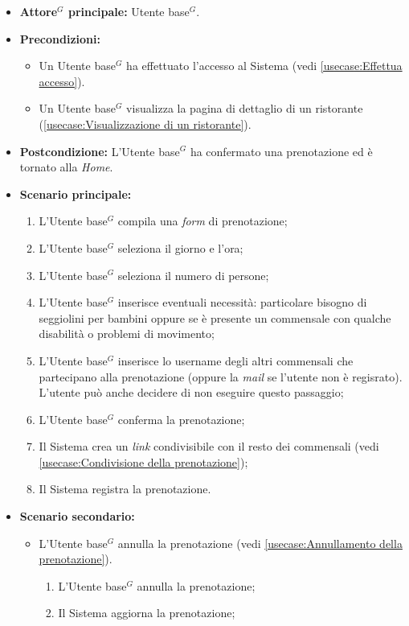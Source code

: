 \label{usecase:Prenotazione di un tavolo}
\begin{itemize}
	\item \textbf{\gls{Attore}$^G$ principale:} \gls{Utente base}$^G$.
	\item \textbf{Precondizioni:}
	      \begin{itemize}
		      \item Un \gls{Utente base}$^G$ ha effettuato l'accesso al Sistema (vedi \autoref{usecase:Effettua accesso}).
		      \item Un \gls{Utente base}$^G$ visualizza la pagina di dettaglio di un ristorante (\autoref{usecase:Visualizzazione di un ristorante}).
	      \end{itemize}
	\item \textbf{Postcondizione:} L'\gls{Utente base}$^G$ ha confermato una prenotazione ed è tornato alla \textit{Home}.


	\item \textbf{Scenario principale:}
	      \begin{enumerate}
		      \item L'\gls{Utente base}$^G$ compila una \textit{form} di prenotazione;
		      \item L'\gls{Utente base}$^G$ seleziona il giorno e l'ora;
		      \item L'\gls{Utente base}$^G$ seleziona il numero di persone;
		      \item L'\gls{Utente base}$^G$ inserisce eventuali necessità: particolare bisogno di seggiolini per bambini oppure se è presente un commensale con qualche disabilità o problemi di movimento;
		      \item L'\gls{Utente base}$^G$ inserisce lo username degli altri commensali che partecipano alla prenotazione (oppure la \textit{mail} se l'utente non è regisrato).
		            L'utente può anche decidere di non eseguire questo passaggio;
		      \item L'\gls{Utente base}$^G$ conferma la prenotazione;
		      \item Il Sistema crea un \textit{link} condivisibile con il resto dei commensali (vedi \autoref{usecase:Condivisione della prenotazione});
		      \item Il Sistema registra la prenotazione.

	      \end{enumerate}

	\item \textbf{Scenario secondario:}
	      \begin{itemize}
		      \item L'\gls{Utente base}$^G$ annulla la prenotazione (vedi
		            \autoref{usecase:Annullamento della prenotazione}).
		            \begin{enumerate}
			            \item L'\gls{Utente base}$^G$ annulla la prenotazione;
			            \item Il Sistema aggiorna la prenotazione;
		            \end{enumerate}
	      \end{itemize}
\end{itemize}

